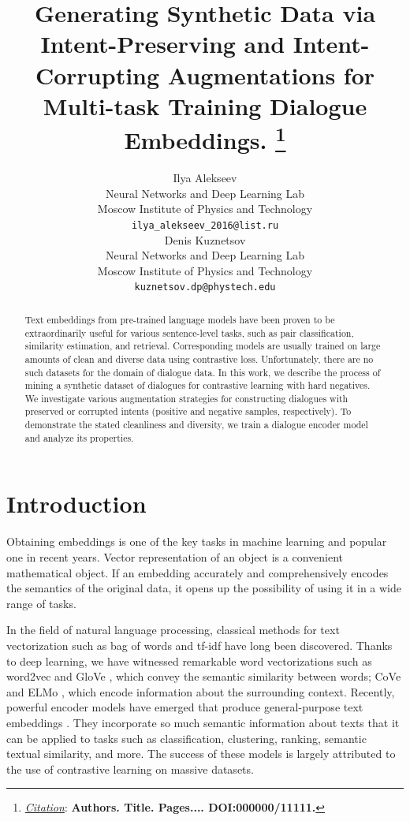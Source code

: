 \documentclass{article}
\title{Generating Synthetic Data via Intent-Preserving and Intent-Corrupting Augmentations for Multi-task Training Dialogue Embeddings.
\thanks{\textit{\underline{Citation}}: 
\textbf{Authors. Title. Pages.... DOI:000000/11111.}} 
}
\author{
  Ilya Alekseev \\
  Neural Networks and Deep Learning Lab \\
  Moscow Institute of Physics and Technology \\
  \texttt{ilya\_alekseev\_2016@list.ru} \\
   \And
  Denis Kuznetsov \\
  Neural Networks and Deep Learning Lab \\
  Moscow Institute of Physics and Technology \\
  \texttt{kuznetsov.dp@phystech.edu} \\
}
\begin{document}
\maketitle


\begin{abstract}
Text embeddings from pre-trained language models have been proven to be extraordinarily useful for various sentence-level tasks, such as pair classification, similarity estimation, and retrieval. Corresponding models are usually trained on large amounts of clean and diverse data using contrastive loss. Unfortunately, there are no such datasets for the domain of dialogue data. In this work, we describe the process of mining a synthetic dataset of dialogues for contrastive learning with hard negatives. We investigate various augmentation strategies for constructing dialogues with preserved or corrupted intents (positive and negative samples, respectively). To demonstrate the stated cleanliness and diversity, we train a dialogue encoder model and analyze its properties.
\end{abstract}




\section{Introduction}
Obtaining embeddings is one of the key tasks in machine learning and popular one in recent years. Vector representation of an object is a convenient mathematical object. If an embedding accurately and comprehensively encodes the semantics of the original data, it opens up the possibility of using it in a wide range of tasks.

In the field of natural language processing, classical methods for text vectorization such as bag of words \cite{bow} and tf-idf \cite{SprckJones2021ASI} have long been discovered. Thanks to deep learning, we have witnessed remarkable word vectorizations such as word2vec \cite{mikolov2013efficient} and GloVe \cite{pennington-etal-2014-glove}, which convey the semantic similarity between words; CoVe \cite{mccann2018learned} and ELMo \cite{peters-etal-2018-deep}, which encode information about the surrounding context. Recently, powerful encoder models have emerged that produce general-purpose text embeddings \cite{xiao2023cpack, wang2022text, li2023general}. They incorporate so much semantic information about texts that it can be applied to tasks such as classification, clustering, ranking, semantic textual similarity, and more. The success of these models is largely attributed to the use of contrastive learning on massive datasets. 
\end{document}
